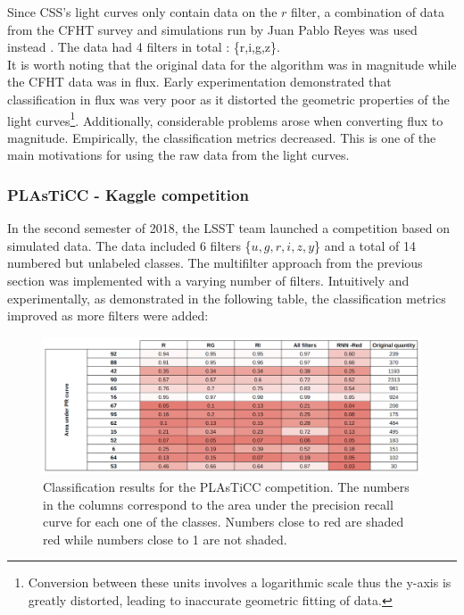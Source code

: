 Since CSS's light curves only contain data on the $r$ filter\cite{catalina}, a combination of data from the CFHT survey\cite{cfht} and simulations run by Juan Pablo Reyes was used instead . The data had 4 filters in total : \{r,i,g,z\}.\\

It is worth noting that the original data for the algorithm was in magnitude while the CFHT data was in flux. Early experimentation demonstrated that classification in flux was very poor as it distorted the geometric properties of the light curves\footnote{Conversion between these units involves a logarithmic scale thus the y-axis is greatly distorted, leading to inaccurate geometric fitting of data.}. Additionally, considerable problems arose when converting flux to magnitude. Empirically, the classification metrics decreased. This is one of the main motivations for using the raw data from the light curves. 

\subsubsection{PLAsTiCC - Kaggle competition}

In the second semester of 2018, the LSST team launched a competition based on simulated data\cite{kaggle}. The data included 6 filters \{$u, g, r, i, z, y$\} and a total of 14 numbered but unlabeled classes. The multifilter approach from the previous section was implemented with a varying number of filters. Intuitively and experimentally, as demonstrated in the following table, the classification metrics improved as more filters were added: 

\begin{figure}[H]
  \centering
  \includegraphics[width=1.05\textwidth]{images/competition.png}
  \caption{Classification results for the PLAsTiCC competition. The numbers in the columns correspond to the area under the precision recall curve for each one of the classes. Numbers close to red are shaded red while numbers close to 1 are not shaded.}
\end{figure}

